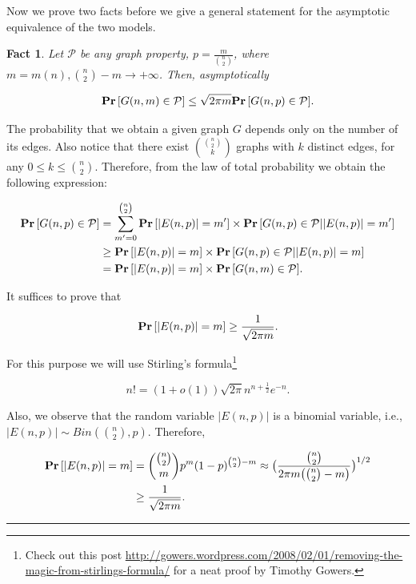 \documentclass[twoside]{article}
\newtheorem{fact}[theorem]{Fact}
\newenvironment{proof}{{\bf Proof:}}{\hfill\rule{2mm}{2mm}}
\newcommand{\Prob}[1]{{{\bf{Pr}}\left[{#1}\right]}}
\begin{document}
Now we prove two facts before we give a general statement for the asymptotic equivalence 
of the two models.

\begin{fact}
Let $\mathcal{P}$ be any graph property, $p=\frac{m}{ {n \choose 2}}$, where $m=m(n), {n \choose 2}-m \rightarrow +\infty$.
Then, asymptotically 


$$ \Prob{ G(n,m) \in \mathcal{P}} \leq \sqrt{ 2 \pi m } \Prob{G(n,p) \in \mathcal{P}}.$$

\end{fact}


\begin{proof}

The probability that we obtain a given graph $G$ depends only on the number of its edges. 
Also notice that there exist ${{n \choose 2} \choose k}$ graphs with $k$ distinct edges, 
for any $0 \leq k \leq {n \choose 2}$. 
Therefore, from the law of total probability we obtain the following expression: 

\begin{align*} 
\Prob{G(n,p) \in \mathcal{P}} &= \sum_{m'=0}^{{n \choose 2}} \Prob{|E(n,p)|=m'} \times \Prob{G(n,p) \in \mathcal{P} | |E(n,p)|=m'} \\ 
                              &\geq \Prob{|E(n,p)|=m} \times \Prob{G(n,p) \in \mathcal{P} | |E(n,p)|=m} \\ 
							   &=\Prob{|E(n,p)|=m} \times \Prob{G(n,m) \in \mathcal{P}}. 
\end{align*}

It suffices to prove that 

$$ \Prob{|E(n,p)|=m} \geq \frac{1}{  \sqrt{ 2 \pi m } }.$$ 

For this purpose we will use Stirling's formula\footnote{Check out 
this post \url{http://gowers.wordpress.com/2008/02/01/removing-the-magic-from-stirlings-formula/} 
for a neat proof by Timothy Gowers.}

$$ n! = (1+o(1)) \sqrt{2 \pi} n^{n+\frac{1}{2}} e^{-n}.$$ 


Also, we observe that the random variable $|E(n,p)|$ is a binomial variable, i.e., $|E(n,p)| \sim Bin( {n \choose 2}, p )$.
Therefore, 

\begin{align*} 
\Prob{|E(n,p)|=m} &= { {n \choose 2} \choose m} p^m (1-p)^{ {n \choose 2} -m} \approx \big ( \frac{ {n \choose 2} }{ 2 \pi m \big({n \choose 2}-m\big)} \big)^{1/2}\\ 
                  &\geq \frac{1}{ \sqrt{ 2 \pi m } }.
\end{align*}
\end{proof}
\end{document}
